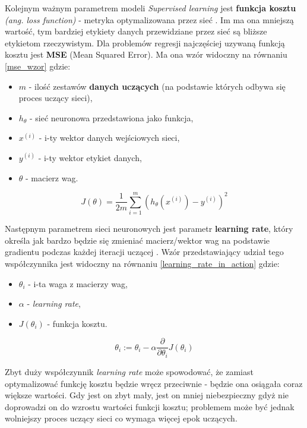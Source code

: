 \documentclass[12pt]{aghdpl}
\begin{document}
			Kolejnym ważnym parametrem modeli \textit{Supervised learning} jest \textbf{funkcja kosztu} \textit{(ang. loss function)} - metryka optymalizowana przez sieć \cite{cost_function_and_gradient_descent}. Im ma ona mniejszą wartość, tym bardziej etykiety danych przewidziane przez sieć są bliższe etykietom rzeczywistym. Dla problemów regresji najczęściej uzywaną funkcją kosztu jest \textbf{MSE} (Mean Squared Error). Ma ona wzór widoczny na równaniu \ref{mse_wzor} gdzie:
			\begin{itemize}
			\item $m$ - ilość zestawów \textbf{danych uczących} (na podstawie których odbywa się proces uczący sieci),
			\item $h_\theta$ - sieć neuronowa przedstawiona jako funkcja,
			\item $x^{(i)}$ - i-ty wektor danych wejściowych sieci,
			\item $y^{(i)}$ - i-ty wektor etykiet danych,
			\item $\theta$ - macierz wag.
			\end{itemize}
			
			\begin{equation} \label{mse_wzor}
			J(\theta) = \frac{1}{2m} \sum_{i = 1}^m (h_\theta(x^{(i)}) - y^{(i)})^2
			\end{equation} 
			
			Następnym parametrem sieci neuronowych jest parametr \textbf{learning rate}, który określa jak bardzo będzie się zmieniać macierz/wektor wag na podstawie gradientu podczas każdej iteracji uczącej \cite{learning_rate}. Wzór przedstawiający udział tego współczynnika jest widoczny na równaniu \ref{learning_rate_in_action} gdzie:
			\begin{itemize}
			\item $\theta_i$ - i-ta waga z macierzy wag,
			\item $\alpha$ - \textit{learning rate},
			\item $J(\theta_i)$ - funkcja kosztu.
			\end{itemize}
			
			\begin{equation} \label{learning_rate_in_action}
			\theta_i := \theta_i - \alpha \frac{\partial}{\partial\theta_i} J(\theta_i)
			\end{equation}
			
			 Zbyt duży współczynnik \textit{learning rate} może spowodować, że zamiast optymalizować funkcję kosztu będzie wręcz przeciwnie - będzie ona osiągała coraz większe wartości. Gdy jest on zbyt mały, jest on mniej niebezpieczny gdyż nie doprowadzi on do wzrostu wartości funkcji kosztu; problemem może być jednak wolniejszy proces uczący sieci co wymaga więcej epok uczących.
			 
\end{document}
